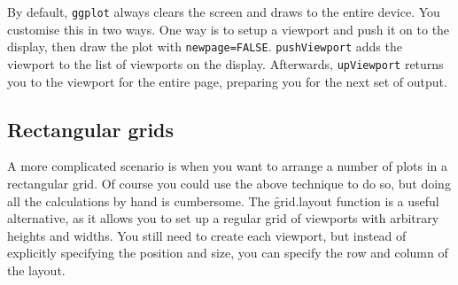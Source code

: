 \begin{figure}[htbp]
  \centering
  \caption{}
  \label{fig:subplot}
\end{figure}

By default, {\tt ggplot} always clears the screen and draws to the entire device.  You customise this in two ways. One way is to setup a viewport and push it on to the display, then draw the plot with {\tt newpage=FALSE}. {\tt pushViewport} adds the viewport to the list of viewports on the display.   Afterwards, {\tt upViewport} returns you to the viewport for the entire page, preparing you for the next set of output.

\subsection{Rectangular grids} 

A more complicated scenario is when you want to arrange a number of plots in a rectangular grid. Of course you could use the above technique to do so, but doing all the calculations by hand is cumbersome. The \f{grid.layout} function is a useful alternative, as it allows you to set up a regular grid of viewports with arbitrary heights and widths. You still need to create each viewport, but instead of explicitly specifying the position and size, you can specify the row and column of the layout.

